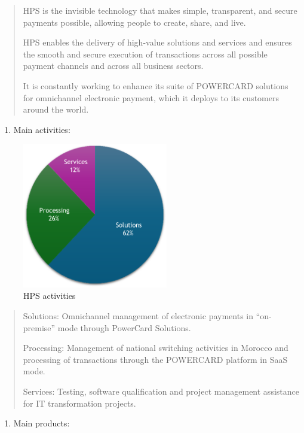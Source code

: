 \documentclass[12pt,a4paper]{report}
\begin{document}
\begin{quote}
HPS is the invisible technology that makes simple, transparent, and
secure payments possible, allowing people to create, share, and live.

HPS enables the delivery of high-value solutions and services and
ensures the smooth and secure execution of transactions across all
possible payment channels and across all business sectors.

It is constantly working to enhance its suite of POWERCARD solutions for
omnichannel electronic payment, which it deploys to its customers around
the world.
\end{quote}

\clearpage
\begin{enumerate}
\def\labelenumi{\arabic{enumi}.}
\setcounter{enumi}{3}
\item
  \protect\hypertarget{_Toc201954398}{}{}Main activities:
\end{enumerate}

\begin{figure}[H]
\centering
\includegraphics[width=2.5in]{vertopal_d1b0b2209edd4c6aa8254f57daa0953b/media/spsHPS.png}
\caption{HPS activities}
\label{fig:spsHPS}
\end{figure}


\begin{quote}
Solutions: Omnichannel management of electronic payments in
``on-premise'' mode through PowerCard Solutions.

Processing: Management of national switching activities in Morocco and
processing of transactions through the POWERCARD platform in SaaS mode.

Services: Testing, software qualification and project management
assistance for IT transformation projects.
\end{quote}

\begin{enumerate}
\def\labelenumi{\arabic{enumi}.}
\setcounter{enumi}{4}
\item
  \protect\hypertarget{_Toc201954399}{}{}Main products:
\end{enumerate}
\end{document}
